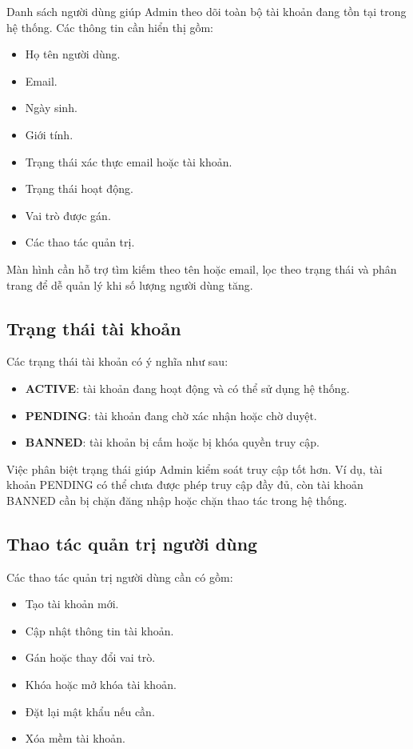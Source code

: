 \documentclass[12pt,a4paper]{report}
\begin{document}
Danh sách người dùng giúp Admin theo dõi toàn bộ tài khoản đang tồn tại trong hệ thống. Các thông tin cần hiển thị gồm:

\begin{itemize}
    \item Họ tên người dùng.
    \item Email.
    \item Ngày sinh.
    \item Giới tính.
    \item Trạng thái xác thực email hoặc tài khoản.
    \item Trạng thái hoạt động.
    \item Vai trò được gán.
    \item Các thao tác quản trị.
\end{itemize}

Màn hình cần hỗ trợ tìm kiếm theo tên hoặc email, lọc theo trạng thái và phân trang để dễ quản lý khi số lượng người dùng tăng.

\subsection{Trạng thái tài khoản}

Các trạng thái tài khoản có ý nghĩa như sau:

\begin{itemize}
    \item \textbf{ACTIVE}: tài khoản đang hoạt động và có thể sử dụng hệ thống.
    \item \textbf{PENDING}: tài khoản đang chờ xác nhận hoặc chờ duyệt.
    \item \textbf{BANNED}: tài khoản bị cấm hoặc bị khóa quyền truy cập.
\end{itemize}

Việc phân biệt trạng thái giúp Admin kiểm soát truy cập tốt hơn. Ví dụ, tài khoản PENDING có thể chưa được phép truy cập đầy đủ, còn tài khoản BANNED cần bị chặn đăng nhập hoặc chặn thao tác trong hệ thống.

\subsection{Thao tác quản trị người dùng}

Các thao tác quản trị người dùng cần có gồm:

\begin{itemize}
    \item Tạo tài khoản mới.
    \item Cập nhật thông tin tài khoản.
    \item Gán hoặc thay đổi vai trò.
    \item Khóa hoặc mở khóa tài khoản.
    \item Đặt lại mật khẩu nếu cần.
    \item Xóa mềm tài khoản.
\end{itemize}
\end{document}
